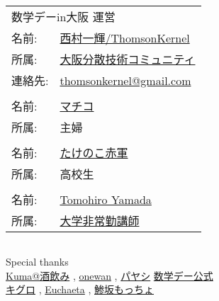 \documentclass[b5paper,fleqn]{ltjsarticle}
\begin{document}
\newpage
\thispagestyle{empty}
\vspace*{\fill}
\begin{flushright}
\begin{minipage}{0.5\hsize}
  \begin{tabular}{|ll}
  \multicolumn{2}{|l}{数学デーin大阪 運営}\\[10pt]
  名前: &\href{https://twitter.com/ThomsonKernel}{西村一輝/ThomsonKernel}\\
  所属: &\href{https://sites.google.com/view/osaka-dtc}{大阪分散技術コミュニティ}\\
  連絡先: & \href{mailto:thomsonkernel@gmail.com}{thomsonkernel@gmail.com}\\
  \\
  名前: &\href{https://twitter.com/YpVGGMA1Eur6Tqy}{マチコ}\\
  所属: &主婦\\
  \\
  名前: &\href{https://twitter.com/691_7758337633}{たけのこ赤軍}\\
  所属: &高校生\\
  \\
  名前: &\href{https://twitter.com/tyamada1093}{Tomohiro Yamada}\\
  所属: &\href{https://kansai-lisp-useres.connpass.com}{大学非常勤講師}\\
  \end{tabular}
  \begin{tabular}{l}
\end{tabular}\vskip15pt
Special thanks\\
   \href{https://twitter.com/notori48}{Kuma@酒飲み}
   , \href{https://twitter.com/ONEWAN}{onewan}
   , \href{https://twitter.com/Paya_payashi}{パヤシ}\vskip10pt
   \href{https://twitter.com/sugaku_day}{数学デー公式}\\
   \href{https://twitter.com/kiguro_masanao}{キグロ}
   , \href{https://twitter.com/euchaeta}{Euchaeta}
   , \href{https://twitter.com/motcho_tw}{鯵坂もっちょ}
\end{minipage}
\end{flushright}
\end{document}
